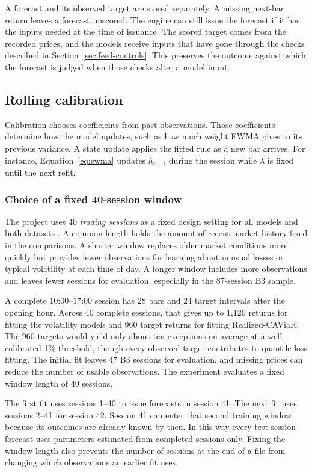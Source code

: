 \documentclass[
	12pt,				%
	openright,			%
	twoside,			%
	a4paper,
	chapter=TITLE,
	english				%
	]{abntex2}
\begin{document}
A forecast and its observed target are stored separately. A missing next-bar return leaves a forecast unscored. The engine can still issue the forecast if it has the inputs needed at the time of issuance. The scored target comes from the recorded prices, and the models receive inputs that have gone through the checks described in Section~\ref{sec:feed-controls}. This preserves the outcome against which the forecast is judged when those checks alter a model input.

\subsection{Rolling calibration}

Calibration chooses coefficients from past observations. Those coefficients determine how the model updates, such as how much weight EWMA gives to its previous variance. A state update applies the fitted rule as a new bar arrives. For instance, Equation~\ref{eq:ewma} updates $h_{t+1}$ during the session while $\lambda$ is fixed until the next refit.

\subsubsection{Choice of a fixed 40-session window}

The project uses 40 \emph{trading sessions} as a fixed design setting for all models and both datasets \cite{project-comparison}. A common length holds the amount of recent market history fixed in the comparisons. A shorter window replaces older market conditions more quickly but provides fewer observations for learning about unusual losses or typical volatility at each time of day. A longer window includes more observations and leaves fewer sessions for evaluation, especially in the 87-session B3 sample.

A complete 10:00--17:00 session has 28 bars and 24 target intervals after the opening hour. Across 40 complete sessions, that gives up to 1,120 returns for fitting the volatility models and 960 target returns for fitting Realized-CAViaR. The 960 targets would yield only about ten exceptions on average at a well-calibrated 1\% threshold, though every observed target contributes to quantile-loss fitting. The initial fit leaves 47 B3 sessions for evaluation, and missing prices can reduce the number of usable observations. The experiment evaluates a fixed window length of 40 sessions.

The first fit uses sessions 1--40 to issue forecasts in session 41. The next fit uses sessions 2--41 for session 42. Session 41 can enter that second training window because its outcomes are already known by then. In this way every test-session forecast uses parameters estimated from completed sessions only. Fixing the window length also prevents the number of sessions at the end of a file from changing which observations an earlier fit uses.
\end{document}
